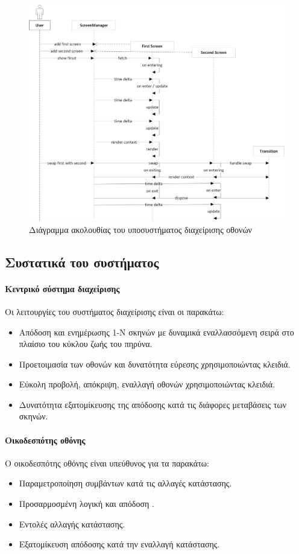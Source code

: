 	\begin{figure}[h!]
		\centering
		\includegraphics[width=165mm]{Images/screensystem_sequence}
		\caption{Διάγραμμα ακολουθίας του υποσυστήματος διαχείρισης οθονών}
		\label{fig:screensystem_sequence}
	\end{figure}	
	
	\subsection{Συστατικά του συστήματος}		
	\paragraph{Κεντρικό σύστημα διαχείρισης}
	Οι λειτουργίες του συστήματος διαχείρισης είναι οι παρακάτω:
	\begin{itemize}
	\item Απόδοση και ενημέρωσης 1-N σκηνών με δυναμικά εναλλασσόμενη σειρά στο πλαίσιο του κύκλου ζωής του πηρύνα.
	\item Προετοιμασία των οθονών και δυνατότητα εύρεσης χρησιμοποιώντας κλειδιά.
	\item Εύκολη προβολή, απόκριψη, εναλλαγή οθονών χρησιμοποιώντας κλειδιά.
	\item Δυνατότητα εξατομίκευσης της απόδοσης κατά τις διάφορες μεταβάσεις των σκηνών.
	\end{itemize}

	\paragraph{Οικοδεσπότης οθόνης}
	Ο οικοδεσπότης οθόνης είναι υπεύθυνος για τα παρακάτω:
	\begin{itemize}
		\item Παραμετροποίηση συμβάντων κατά τις αλλαγές κατάστασης.
		\item Προσαρμοσμένη λογική και απόδοση .
		\item Εντολές αλλαγής κατάστασης.
		\item Εξατομίκευση απόδοσης κατά την εναλλαγή κατάστασης.
	\end{itemize}
	
